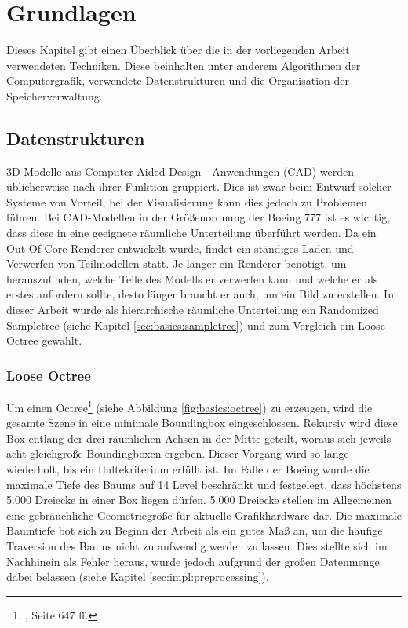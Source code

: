 \chapter{Grundlagen}
\label{chap:basics}
%
Dieses Kapitel gibt einen Überblick über die in der vorliegenden Arbeit verwendeten Techniken. Diese beinhalten unter anderem Algorithmen der Computergrafik, verwendete Datenstrukturen und die Organisation der Speicherverwaltung.

\section{Datenstrukturen}
\label{sec:basics:datenstrukturen}
3D-Modelle aus Computer Aided Design - Anwendungen (CAD) werden üblicherweise nach ihrer Funktion gruppiert. Dies ist zwar beim Entwurf solcher Systeme von Vorteil, bei der Visualisierung kann dies jedoch zu Problemen führen. Bei CAD-Modellen in der Größenordnung der Boeing 777 ist es wichtig, dass diese in eine geeignete räumliche Unterteilung überführt werden. Da ein Out-Of-Core-Renderer entwickelt wurde, findet ein ständiges Laden und Verwerfen von Teilmodellen statt. Je länger ein Renderer benötigt, um herauszufinden, welche Teile des Modells er verwerfen kann und welche er als erstes anfordern sollte, desto länger braucht er auch, um ein Bild zu erstellen. In dieser Arbeit wurde als hierarchische räumliche Unterteilung ein Randomized Sampletree (siehe Kapitel \ref{sec:basics:sampletree}) und zum Vergleich ein Loose Octree gewählt.

\subsection{Loose Octree}
\label{sec:basics:octree}
Um einen Octree\footnote{\cite{RTR3}, Seite 647 ff.} (siehe Abbildung \ref{fig:basics:octree}) zu erzeugen, wird die gesamte Szene in eine minimale Boundingbox eingeschlossen. Rekursiv wird diese Box entlang der drei räumlichen Achsen in der Mitte geteilt, woraus sich jeweils acht gleichgroße Boundingboxen ergeben. Dieser Vorgang wird so lange wiederholt, bis ein Haltekriterium erfüllt ist. Im Falle der Boeing wurde die maximale Tiefe des Baums auf 14 Level beschränkt und festgelegt, dass höchstens 5.000 Dreiecke in einer Box liegen dürfen. 5.000 Dreiecke stellen im Allgemeinen eine gebräuchliche Geometriegröße für aktuelle Grafikhardware dar. Die maximale Baumtiefe bot sich zu Beginn der Arbeit als ein gutes Maß an, um die häufige Traversion des Baums nicht zu aufwendig werden zu lassen. Dies stellte sich im Nachhinein als Fehler heraus, wurde jedoch aufgrund der großen Datenmenge dabei belassen (siehe Kapitel \ref{sec:impl:preprocessing}).


